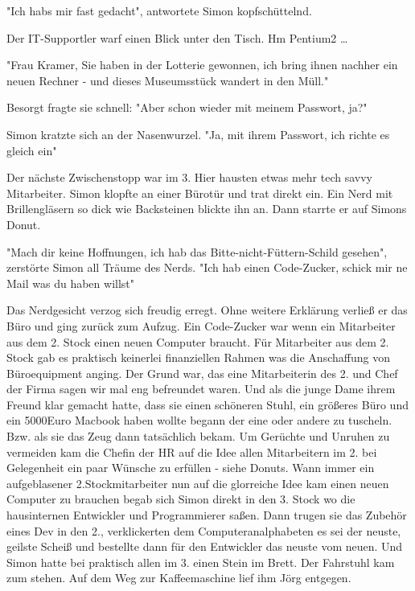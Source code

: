 \documentclass[ebook]{article}
\begin{document}
\begin{center}
"Ich habs mir fast gedacht", antwortete Simon kopfschüttelnd.
\end{center}

\noindent Der IT-Supportler warf einen Blick unter den Tisch. Hm
Pentium2 \ldots{}

\begin{center}
"Frau Kramer, Sie haben in der Lotterie gewonnen, ich bring ihnen
nachher ein neuen Rechner - und dieses Museumsstück wandert in den
Müll."
\end{center}

\begin{center}
Besorgt fragte sie schnell: "Aber schon wieder mit meinem Passwort, ja?"
\end{center}

\begin{center}
Simon kratzte sich an der Nasenwurzel. "Ja, mit ihrem Passwort, ich
richte es gleich ein"
\end{center}

\noindent Der nächste Zwischenstopp war im 3. Hier hausten etwas mehr
tech savvy Mitarbeiter. Simon klopfte an einer Bürotür und trat
direkt ein. Ein Nerd mit Brillengläsern so dick wie Backsteinen
blickte ihn an. Dann starrte er auf Simons Donut.

\begin{center}
"Mach dir keine Hoffnungen, ich hab das Bitte-nicht-Füttern-Schild
gesehen", zerstörte Simon all Träume des Nerds. "Ich hab einen
Code-Zucker, schick mir ne Mail was du haben willst"
\end{center}

\noindent Das Nerdgesicht verzog sich freudig erregt. Ohne weitere
Erklärung verließ er das Büro und ging zurück zum Aufzug. Ein
Code-Zucker war wenn ein Mitarbeiter aus dem 2. Stock einen neuen
Computer braucht. Für Mitarbeiter aus dem 2. Stock gab es praktisch
keinerlei finanziellen Rahmen was die Anschaffung von Büroequipment
anging. Der Grund war, das eine Mitarbeiterin des 2. und Chef der
Firma sagen wir mal eng befreundet waren. Und als die junge Dame
ihrem Freund klar gemacht hatte, dass sie einen schöneren Stuhl, ein
größeres Büro und ein 5000Euro Macbook haben wollte begann der eine
oder andere zu tuscheln. Bzw. als sie das Zeug dann tatsächlich
bekam. Um Gerüchte und Unruhen zu vermeiden kam die Chefin der HR
auf die Idee allen Mitarbeitern im 2. bei Gelegenheit ein paar
Wünsche zu erfüllen - siehe Donuts. Wann immer ein aufgeblasener
2.Stockmitarbeiter nun auf die glorreiche Idee kam einen neuen
Computer zu brauchen begab sich Simon direkt in den 3. Stock wo die
hausinternen Entwickler und Programmierer saßen. Dann trugen sie das
Zubehör eines Dev in den 2., verklickerten dem Computeranalphabeten
es sei der neuste, geilste Scheiß und bestellte dann für den
Entwickler das neuste vom neuen. Und Simon hatte bei praktisch allen
im 3. einen Stein im Brett. Der Fahrstuhl kam zum stehen. Auf dem
Weg zur Kaffeemaschine lief ihm Jörg entgegen.
\end{document}
